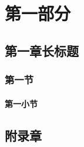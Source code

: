 \documentclass[a4paper,10pt]{book}
\begin{document}
\frontmatter
\tableofcontents
\mainmatter
\part{第一部分}
\chapter[短章]{第一章长标题}
\section{第一节}
\subsection{第一小节}
\appendix
\chapter{附录章}
\backmatter
\end{document}
